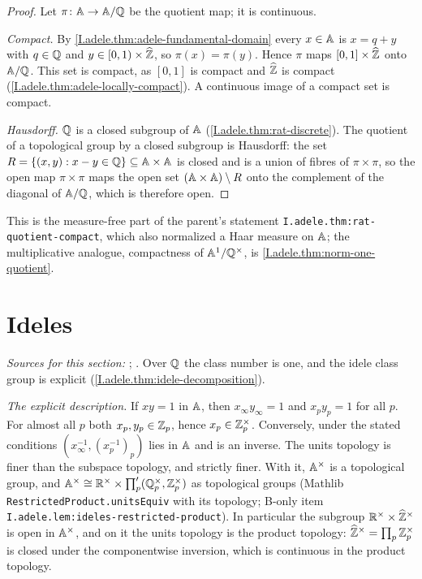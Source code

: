 \begin{theorem}
\end{theorem}
\begin{proof}
Let $\pi\colon\mathbb{A}\to\mathbb{A}/\mathbb{Q}$ be the quotient map; it is continuous.

\emph{Compact.} By \cref{I.adele.thm:adele-fundamental-domain} every $x\in\mathbb{A}$ is $x=q+y$ with $q\in\mathbb{Q}$ and
$y\in[0,1)\times\widehat{\mathbb{Z}}$, so $\pi(x)=\pi(y)$. Hence $\pi$ maps $[0,1]\times\widehat{\mathbb{Z}}$ onto $\mathbb{A}/\mathbb{Q}$. This set is compact,
as $[0,1]$ is compact and $\widehat{\mathbb{Z}}$ is compact (\cref{I.adele.thm:adele-locally-compact}). A continuous image of a compact
set is compact.

\emph{Hausdorff.} $\mathbb{Q}$ is a closed subgroup of $\mathbb{A}$ (\cref{I.adele.thm:rat-discrete}). The quotient of a topological
group by a closed subgroup is Hausdorff: the set $R=\{(x,y):x-y\in\mathbb{Q}\}\subseteq\mathbb{A}\times\mathbb{A}$ is closed and is a union of
fibres of $\pi\times\pi$, so the open map $\pi\times\pi$ maps the open set $(\mathbb{A}\times\mathbb{A})\setminus R$ onto the complement of the
diagonal of $\mathbb{A}/\mathbb{Q}$, which is therefore open.
\end{proof}
\noindent This is the measure-free part of the parent's statement \texttt{I.adele.thm:rat-quotient-compact}, which also
normalized a Haar measure on $\mathbb{A}$; the multiplicative analogue, compactness of $\mathbb{A}^1/\mathbb{Q}^\times$, is
\cref{I.adele.thm:norm-one-quotient}.

\section{Ideles}\label{sec:adele-ideles}

\noindent\emph{Sources for this section:} \cite[§§1.3--1.4]{GH}; \cite[§§3.3--3.4]{Corv-ptIII-1}. Over $\mathbb{Q}$ the class
number is one, and the idele class group is explicit (\cref{I.adele.thm:idele-decomposition}).

\begin{definition}[ideles]
\end{definition}
\noindent\emph{The explicit description.} If $xy=1$ in $\mathbb{A}$, then $x_\infty y_\infty=1$ and $x_py_p=1$ for all $p$.
For almost all $p$ both $x_p,y_p\in\mathbb{Z}_p$, hence $x_p\in\mathbb{Z}_p^\times$. Conversely, under the stated conditions
$(x_\infty^{-1},(x_p^{-1})_p)$ lies in $\mathbb{A}$ and is an inverse. The units topology is finer than the subspace topology,
and strictly finer. With it, $\mathbb{A}^\times$ is a topological group, and $\mathbb{A}^\times\cong\mathbb{R}^\times\times\prod'_p(\mathbb{Q}_p^\times,\mathbb{Z}_p^\times)$
as topological groups (Mathlib \texttt{RestrictedProduct.unitsEquiv} with its topology; B-only item
\texttt{I.adele.lem:ideles-restricted-product}). In particular the subgroup $\mathbb{R}^\times\times\widehat{\mathbb{Z}}^\times$ is open in
$\mathbb{A}^\times$, and on it the units topology is the product topology: $\widehat{\mathbb{Z}}^\times=\prod_p\mathbb{Z}_p^\times$ is closed under
the componentwise inversion, which is continuous in the product topology.

